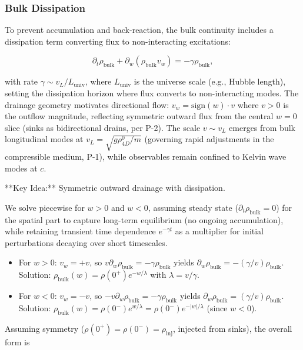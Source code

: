 \subsubsection{Bulk Dissipation}
To prevent accumulation and back-reaction, the bulk continuity includes a dissipation term converting flux to non-interacting excitations:

\begin{equation}
\partial_t \rho_{\text{bulk}} + \partial_w (\rho_{\text{bulk}} v_w) = -\gamma \rho_{\text{bulk}},
\end{equation}

with rate $\gamma \sim v_L / L_{\text{univ}}$, where $L_{\text{univ}}$ is the universe scale (e.g., Hubble length), setting the dissipation horizon where flux converts to non-interacting modes. The drainage geometry motivates directional flow: $v_w = \text{sign}(w) \cdot v$ where $v > 0$ is the outflow magnitude, reflecting symmetric outward flux from the central $w=0$ slice (sinks as bidirectional drains, per P-2). The scale $v \sim v_L$ emerges from bulk longitudinal modes at $v_L = \sqrt{g \rho_{4D}^0 / m}$ (governing rapid adjustments in the compressible medium, P-1), while observables remain confined to Kelvin wave modes at $c$.

**Key Idea:** Symmetric outward drainage with dissipation.

We solve piecewise for $w > 0$ and $w < 0$, assuming steady state ($\partial_t \rho_{\text{bulk}} = 0$) for the spatial part to capture long-term equilibrium (no ongoing accumulation), while retaining transient time dependence $e^{-\gamma t}$ as a multiplier for initial perturbations decaying over short timescales.

\begin{itemize}
\item For $w > 0$: $v_w = +v$, so $v \partial_w \rho_{\text{bulk}} = -\gamma \rho_{\text{bulk}}$ yields $\partial_w \rho_{\text{bulk}} = -(\gamma / v) \rho_{\text{bulk}}$. Solution: $\rho_{\text{bulk}}(w) = \rho(0^+) e^{-w / \lambda}$ with $\lambda = v / \gamma$.
\item For $w < 0$: $v_w = -v$, so $-v \partial_w \rho_{\text{bulk}} = -\gamma \rho_{\text{bulk}}$ yields $\partial_w \rho_{\text{bulk}} = (\gamma / v) \rho_{\text{bulk}}$. Solution: $\rho_{\text{bulk}}(w) = \rho(0^-) e^{w / \lambda} = \rho(0^-) e^{-|w| / \lambda}$ (since $w < 0$).
\end{itemize}

Assuming symmetry ($\rho(0^+) = \rho(0^-) = \rho_{\text{inj}}$, injected from sinks), the overall form is


